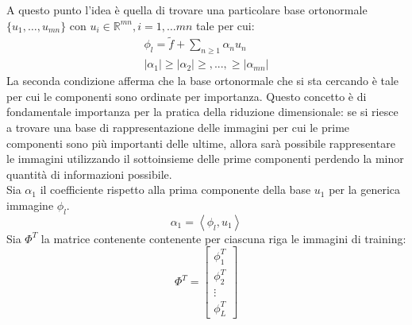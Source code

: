 A questo punto l'idea è quella di trovare una particolare base ortonormale \(\{u_1, \dots,u_{mn}\}\) con \(u_i \in \mathbb{R}^{mn}, i=1,\dots mn\) tale per cui:
\begin{eqnarray*}
    \phi_l = \tilde{f} +  \sum \limits_{n\geq 1} \alpha_n u_n \\
|\alpha_1| \geq |\alpha_2| \geq, ..., \geq |\alpha_{mn}|
\end{eqnarray*}
La seconda condizione afferma che la base ortonormale che si sta cercando è tale per cui le componenti sono ordinate per importanza. Questo concetto è di fondamentale importanza per la pratica della riduzione dimensionale: se si riesce a trovare una base di rappresentazione delle immagini per cui le prime componenti sono più importanti delle ultime, allora sarà possibile rappresentare le immagini utilizzando il sottoinsieme delle prime componenti perdendo la minor quantità di informazioni possibile.
\\
Sia \(\alpha_1\) il coefficiente rispetto alla prima componente della base \(u_1\) per la generica immagine \(\phi_l\). 
\[
    \alpha_1 = \left\langle\phi_l, u_1 \right\rangle  
    \]
Sia \(\Phi^T\) la matrice contenente contenente per ciascuna riga le immagini di training:
\[\Phi^T = \begin{bmatrix}
    \phi_1^T \\
    \phi_2^T \\
    \vdots \\
    \phi_L^T
\end{bmatrix}
    \]

